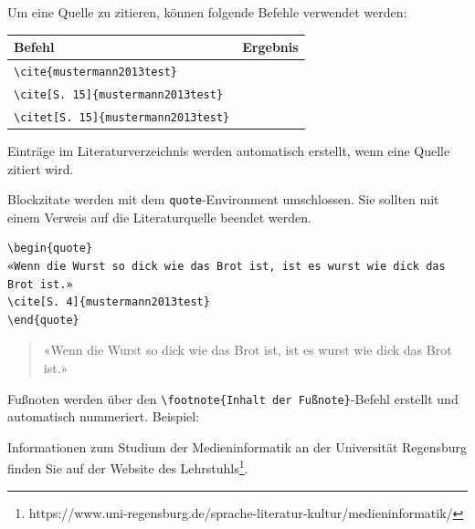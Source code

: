 Um eine Quelle zu zitieren, können folgende Befehle verwendet werden:

\bigskip

\begin{tabular}{@{}ll@{}}
\hline
\textbf{Befehl} & \textbf{Ergebnis} \\
\hline
    \verb|\cite{mustermann2013test}| & \cite{mustermann2013test} \\
    \verb|\cite[S. 15]{mustermann2013test}| & \cite[S. 15]{mustermann2013test} \\
    \verb|\citet[S. 15]{mustermann2013test}| & \citet[S. 15]{mustermann2013test} \\
\hline
\end{tabular}

\bigskip

Einträge im Literaturverzeichnis werden automatisch erstellt, wenn eine Quelle zitiert wird.


Blockzitate werden mit dem \verb|quote|-Environment umschlossen.
Sie sollten mit einem Verweis auf die Literaturquelle beendet werden.

\begin{verbatim}
\begin{quote}
«Wenn die Wurst so dick wie das Brot ist, ist es wurst wie dick das Brot ist.»
\cite[S. 4]{mustermann2013test}
\end{quote}
\end{verbatim}

\begin{quote}
«Wenn die Wurst so dick wie das Brot ist, ist es wurst wie dick das Brot ist.»
\cite[S. 4]{mustermann2013test}
\end{quote}


Fußnoten werden über den \verb|\footnote{Inhalt der Fußnote}|-Befehl erstellt und automatisch nummeriert. Beispiel:

Informationen zum Studium der Medieninformatik an der Universität Regensburg finden Sie auf der Website des Lehrstuhls\footnote{https://www.uni-regensburg.de/sprache-literatur-kultur/medieninformatik/}.
